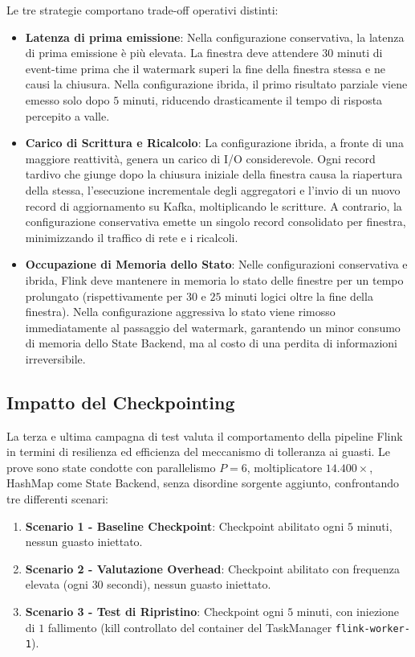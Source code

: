 \documentclass[conference]{IEEEtran}
\begin{document}
Le tre strategie comportano trade-off operativi distinti:
\begin{itemize}
    \item \textbf{Latenza di prima emissione}: Nella configurazione conservativa, la latenza di prima emissione è più elevata. La finestra deve attendere $30$ minuti di event-time prima che il watermark superi la fine della finestra stessa e ne causi la chiusura. Nella configurazione ibrida, il primo risultato parziale viene emesso solo dopo $5$ minuti, riducendo drasticamente il tempo di risposta percepito a valle.
    \item \textbf{Carico di Scrittura e Ricalcolo}: La configurazione ibrida, a fronte di una maggiore reattività, genera un carico di I/O considerevole. Ogni record tardivo che giunge dopo la chiusura iniziale della finestra causa la riapertura della stessa, l'esecuzione incrementale degli aggregatori e l'invio di un nuovo record di aggiornamento su Kafka, moltiplicando le scritture. A contrario, la configurazione conservativa emette un singolo record consolidato per finestra, minimizzando il traffico di rete e i ricalcoli.
    \item \textbf{Occupazione di Memoria dello Stato}: Nelle configurazioni conservativa e ibrida, Flink deve mantenere in memoria lo stato delle finestre per un tempo prolungato (rispettivamente per $30$ e $25$ minuti logici oltre la fine della finestra). Nella configurazione aggressiva lo stato viene rimosso immediatamente al passaggio del watermark, garantendo un minor consumo di memoria dello State Backend, ma al costo di una perdita di informazioni irreversibile.
\end{itemize}

\subsection{Impatto del Checkpointing}\label{subsec:perf_checkpoint_fault_tolerance}

La terza e ultima campagna di test valuta il comportamento della pipeline Flink in termini di resilienza ed efficienza del meccanismo di tolleranza ai guasti. Le prove sono state condotte con parallelismo $P=6$, moltiplicatore $14.400\times$, HashMap come State Backend, senza disordine sorgente aggiunto, confrontando tre differenti scenari:
\begin{enumerate}
    \item \textbf{Scenario 1 - Baseline Checkpoint}: Checkpoint abilitato ogni $5$ minuti, nessun guasto iniettato.
    \item \textbf{Scenario 2 - Valutazione Overhead}: Checkpoint abilitato con frequenza elevata (ogni $30$ secondi), nessun guasto iniettato.
    \item \textbf{Scenario 3 - Test di Ripristino}: Checkpoint ogni $5$ minuti, con iniezione di $1$ fallimento (kill controllato del container del TaskManager \texttt{flink-worker-1}).
\end{enumerate}
\end{document}
